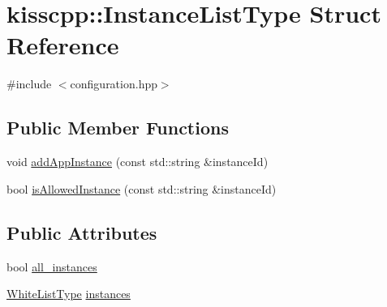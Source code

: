 \hypertarget{a00028}{\section{kisscpp\-:\-:Instance\-List\-Type Struct Reference}
\label{a00028}
}


{\ttfamily \#include $<$configuration.\-hpp$>$}

\subsection*{Public Member Functions}
\begin{DoxyCompactItemize}
\item 
void \hyperlink{a00028_a7040d7a8d1bb673d1e5d9de241fdd1b0}{add\-App\-Instance} (const std\-::string \&instance\-Id)
\item 
bool \hyperlink{a00028_add939d7a7d3ea4e6218435fbae1bd0ea}{is\-Allowed\-Instance} (const std\-::string \&instance\-Id)
\end{DoxyCompactItemize}
\subsection*{Public Attributes}
\begin{DoxyCompactItemize}
\item 
bool \hyperlink{a00028_a369b1be877ef96e3b30fbc5e7c1fb429}{all\-\_\-instances}
\item 
\hyperlink{a00089_a6aa00ccbe46e3a892fa90d3fbf6e3439}{White\-List\-Type} \hyperlink{a00028_ab41a6811d252741bb3000bc13733e19b}{instances}
\end{DoxyCompactItemize}


